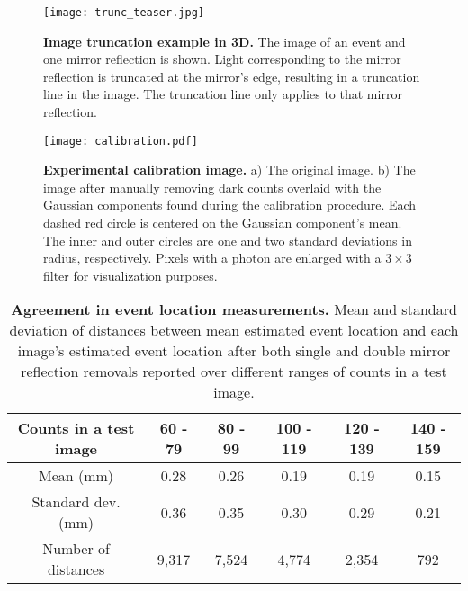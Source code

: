 \documentclass{article}
\begin{document}
{\begin{figure}
\centering
\texttt{[image: trunc\_teaser.jpg]}
\caption{\textbf{Image truncation example in 3D.}
The image of an event and one mirror reflection is shown. 
Light corresponding to the mirror reflection is truncated at the mirror's edge, 
resulting in a truncation line in the image.
The truncation line only applies to that mirror reflection.}
\label{fig:trunc_teaser}
\end{figure}  





\begin{figure*}
\centering
\texttt{[image: calibration.pdf]}
\caption{\textbf{Experimental calibration image.} a) The original image. b) The image after manually 
removing dark counts overlaid with the Gaussian components found during the 
calibration procedure.
Each dashed red circle is centered on the Gaussian component's mean. 
The inner and outer circles are one and two standard deviations in radius, respectively.
Pixels with a photon are enlarged with a $3 \times 3$ filter for visualization purposes.
} 
\label{fig:calibration}
\end{figure*}


\begin{table}[h!]
\centering
\begin{tabular}{|c|ccccc|}
\hline
Counts in a test image & 60 - 79 & 80 - 99 & 100 - 119 & 120 - 139 & 140 - 159 \\
\hline
Mean (mm)                & 0.28 & 0.26 & 0.19 & 0.19 & 0.15 \\
Standard dev.  (mm)      & 0.36 & 0.35 & 0.30 & 0.29 & 0.21  \\
Number of distances    & 9,317  & 7,524  & 4,774  & 2,354  & 792 \\
\hline
\end{tabular}
\caption{\textbf{Agreement in event location measurements.} Mean and standard deviation of distances between mean estimated 
event location and each image's estimated event location after both single and 
double mirror reflection removals reported over different ranges of counts in a 
test image.}
\label{tab:crossval_thresh_error}
\end{table}

  
}{}
\end{document}
